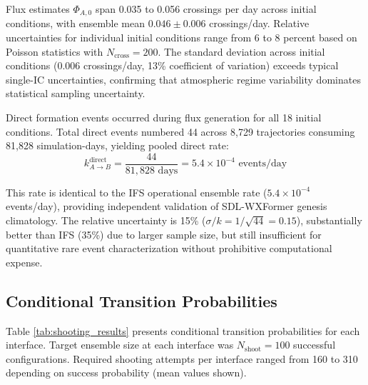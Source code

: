 \documentclass[11pt]{article}
\begin{document}
Flux estimates $\Phi_{A,0}$ span 0.035 to 0.056 crossings per day across initial conditions, with ensemble mean $0.046 \pm 0.006$ crossings/day. Relative uncertainties for individual initial conditions range from 6 to 8 percent based on Poisson statistics with $N_{\text{cross}} = 200$. The standard deviation across initial conditions ($0.006$ crossings/day, 13\% coefficient of variation) exceeds typical single-IC uncertainties, confirming that atmospheric regime variability dominates statistical sampling uncertainty.

Direct formation events occurred during flux generation for all 18 initial conditions. Total direct events numbered 44 across 8,729 trajectories consuming 81,828 simulation-days, yielding pooled direct rate:
\begin{equation}
k_{A \to B}^{\text{direct}} = \frac{44}{81{,}828 \text{ days}} = 5.4 \times 10^{-4} \text{ events/day}
\end{equation}

This rate is identical to the IFS operational ensemble rate ($5.4 \times 10^{-4}$ events/day), providing independent validation of SDL-WXFormer genesis climatology. The relative uncertainty is 15\% ($\sigma/k = 1/\sqrt{44} = 0.15$), substantially better than IFS (35\%) due to larger sample size, but still insufficient for quantitative rare event characterization without prohibitive computational expense.

\subsection{Conditional Transition Probabilities}

Table \ref{tab:shooting_results} presents conditional transition probabilities for each interface. Target ensemble size at each interface was $N_{\text{shoot}} = 100$ successful configurations. Required shooting attempts per interface ranged from 160 to 310 depending on success probability (mean values shown).
\end{document}
